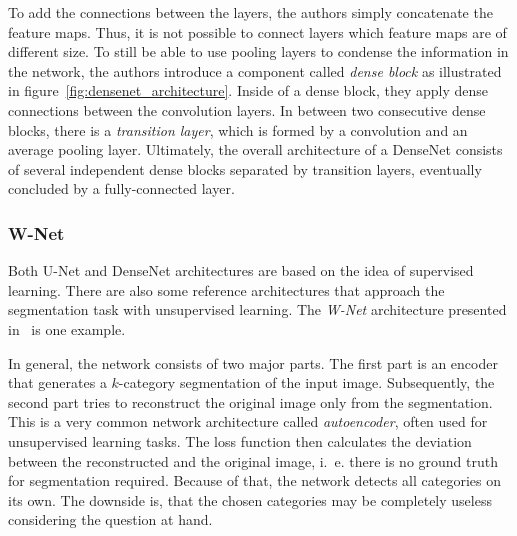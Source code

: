 To add the connections between the layers, the authors simply concatenate the feature maps. Thus, it is not possible to connect layers which feature maps are of different size. To still be able to use pooling layers to condense the information in the network, the authors introduce a component called \emph{dense block} as illustrated in figure~\ref{fig:densenet_architecture}. Inside of a dense block, they apply dense connections between the convolution layers. In between two consecutive dense blocks, there is a \emph{transition layer}, which is formed by a convolution and an average pooling layer. Ultimately, the overall architecture of a DenseNet consists of several independent dense blocks separated by transition layers, eventually concluded by a fully-connected layer.


\subsubsection{W-Net}
\label{sec:w-net}
Both U-Net and DenseNet architectures are based on the idea of supervised learning. There are also some reference architectures that approach the segmentation task with unsupervised learning. The \emph{W-Net} architecture presented in~\cite{wnet17} is one example.

In general, the network consists of two major parts. The first part is an encoder that generates a $k$-category segmentation of the input image. Subsequently, the second part tries to reconstruct the original image only from the segmentation. This is a very common network architecture called \emph{autoencoder}, often used for unsupervised learning tasks. The loss function then calculates the deviation between the reconstructed and the original image, i.~e. there is no ground truth for segmentation required. Because of that, the network detects all categories on its own. The downside is, that the chosen categories may be completely useless considering the question at hand.

